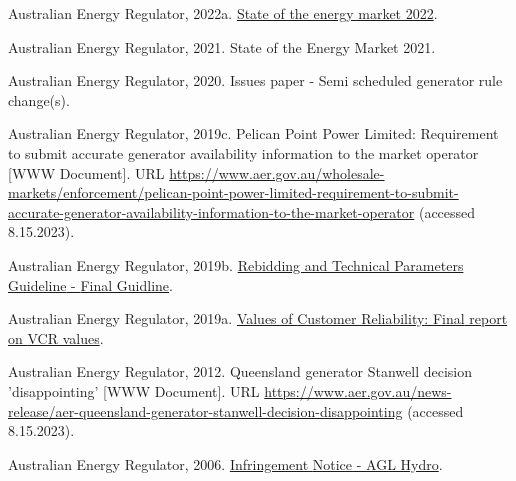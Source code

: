 \documentclass[12pt,a4paper,]{report}
\newlength{\cslhangindent}
\newenvironment{CSLReferences}[2] %
 {%
  \setlength{\parindent}{0pt}
  \ifodd #1 \everypar{\setlength{\hangindent}{\cslhangindent}}\ignorespaces\fi
  \ifnum #2 > 0
  \setlength{\parskip}{#2\baselineskip}
  \fi
 }%
 {}
\begin{document}
\begin{CSLReferences}{1}{0}
\leavevmode{}%
Australian Energy Regulator, 2022a.
\href{https://www.aer.gov.au/system/files/State\%20of\%20the\%20energy\%20market\%202022\%20-\%20Full\%20report.pdf}{State
of the energy market 2022}.

\leavevmode{}%
Australian Energy Regulator, 2021. State of the {Energy Market} 2021.

\leavevmode{}%
Australian Energy Regulator, 2020. Issues paper - {Semi} scheduled
generator rule change(s).

\leavevmode{}%
Australian Energy Regulator, 2019c. Pelican {Point Power Limited}:
Requirement to submit accurate generator availability information to the
market operator {[}WWW Document{]}. URL
\url{https://www.aer.gov.au/wholesale-markets/enforcement/pelican-point-power-limited-requirement-to-submit-accurate-generator-availability-information-to-the-market-operator}
(accessed 8.15.2023).

\leavevmode{}%
Australian Energy Regulator, 2019b.
\href{https://www.aer.gov.au/system/files/For\%20publish\%20-\%20Rebidding\%20and\%20technical\%20parameters\%20guideline\%20-\%20final\%20guideline\%20\%282019\%20amendments\%29.pdf}{Rebidding
and {Technical Parameters Guideline} - {Final Guidline}}.

\leavevmode{}%
Australian Energy Regulator, 2019a.
\href{https://www.aer.gov.au/system/files/AER\%20-\%20Values\%20of\%20Customer\%20Reliability\%20Review\%20-\%20Final\%20Report\%20-\%20December\%202019.pdf}{Values
of {Customer Reliability}: {Final} report on {VCR} values}.

\leavevmode{}%
Australian Energy Regulator, 2012. Queensland generator {Stanwell}
decision 'disappointing' {[}WWW Document{]}. URL
\url{https://www.aer.gov.au/news-release/aer-queensland-generator-stanwell-decision-disappointing}
(accessed 8.15.2023).

\leavevmode{}%
Australian Energy Regulator, 2006.
\href{https://www.aer.gov.au/system/files/AGL\%20Infringement\%20Notice.pdf}{Infringement
{Notice} - {AGL Hydro}}.


\end{CSLReferences}
\end{document}

